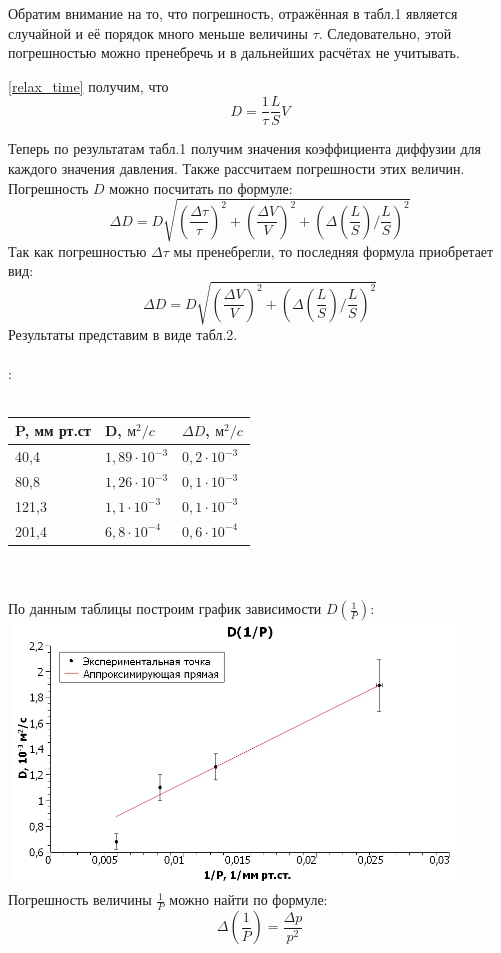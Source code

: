 \documentclass[15pt,a5paper,reqno]{article}
\begin{document}
    Обратим внимание на то, что погрешность, отражённая в табл.1 является случайной и её порядок много меньше величины $\tau$. Следовательно, этой погрешностью можно пренебречь и в дальнейших расчётах не учитывать.
    
     \eqref{relax_time} получим, что 
    \[D = \frac{1}{\tau}\frac{L}{S}V\]
    
    Теперь по результатам табл.1 получим значения коэффициента диффузии для каждого значения давления. Также рассчитаем погрешности этих величин. Погрешность $D$ можно посчитать по формуле:
    \[\Delta D = D\sqrt{\left(\frac{\Delta\tau}{\tau}\right)^2 + \left(\frac{\Delta V}{V}\right)^2 + \left(\Delta\left(\frac{L}{S}\right)/\frac{L}{S}\right)^2}\]
    \noindent Так как погрешностью $\Delta\tau$ мы пренебрегли, то последняя формула приобретает вид:
    \[\Delta D = D\sqrt{\left(\frac{\Delta V}{V}\right)^2 + \left(\Delta\left(\frac{L}{S}\right)/\frac{L}{S}\right)^2}\]
    Результаты представим в виде табл.2.\\
    \\
    :\\
    \\
    \begin{tabular}{ | l | l | l | }
    \hline
    P, мм рт.ст & D, $\text{м}^2/c$& $\Delta D$, $\text{м}^2/c$ \\ \hline
    40,4 & $1,89\cdot10^{-3}$ & $0,2\cdot10^{-3}$ \\ \hline
    80,8 & $1,26\cdot10^{-3}$ & $0,1\cdot10^{-3}$  \\ \hline
    121,3 & $1,1\cdot10^{-3}$ & $0,1\cdot10^{-3}$ \\ \hline
    201,4 & $6,8\cdot10^{-4}$ & $0,6\cdot10^{-4}$ \\
    \hline
    \end{tabular}\\
    \\
    По данным таблицы построим график зависимости $D(\frac{1}{P})$:\\
    \includegraphics[width = 12cm, height = 7cm]{График.jpg}
    \\
    Погрешность величины $\frac{1}{P}$ можно найти по формуле:
    \[\Delta\left(\frac{1}{P}\right) = \frac{\Delta p}{p^2}\]
    
\end{document}
